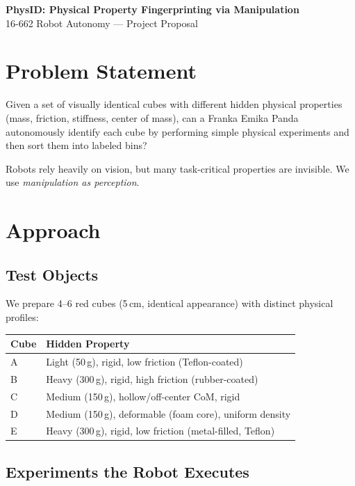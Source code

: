 \documentclass[10pt]{article}
\begin{document}
\begin{center}
{\Large \textbf{PhysID: Physical Property Fingerprinting via Manipulation}}\\[2pt]
{\normalsize 16-662 Robot Autonomy --- Project Proposal}
\end{center}

\section{Problem Statement}

Given a set of visually identical cubes with different hidden physical properties (mass, friction, stiffness, center of mass), can a Franka Emika Panda autonomously identify each cube by performing simple physical experiments and then sort them into labeled bins?

Robots rely heavily on vision, but many task-critical properties are invisible. We use \textit{manipulation as perception}.

\section{Approach}

\subsection{Test Objects}
We prepare 4--6 red cubes (5\,cm, identical appearance) with distinct physical profiles:

\begin{center}
\small
\begin{tabularx}{0.95\textwidth}{lX}
\toprule
\textbf{Cube} & \textbf{Hidden Property} \\
\midrule
A & Light (50\,g), rigid, low friction (Teflon-coated) \\
B & Heavy (300\,g), rigid, high friction (rubber-coated) \\
C & Medium (150\,g), hollow/off-center CoM, rigid \\
D & Medium (150\,g), deformable (foam core), uniform density \\
E & Heavy (300\,g), rigid, low friction (metal-filled, Teflon) \\
\bottomrule
\end{tabularx}
\end{center}

\subsection{Experiments the Robot Executes}
\end{document}
